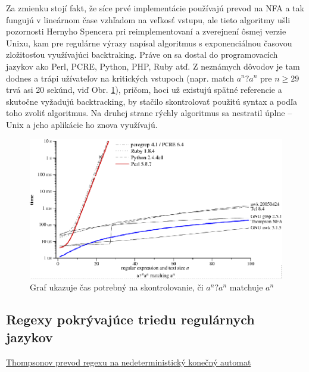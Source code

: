 Za zmienku stojí fakt, že síce prvé implementácie používajú prevod na NFA a tak fungujú v lineárnom čase vzhľadom na veľkosť vstupu, ale tieto algoritmy ušli pozornosti Hernyho Spencera pri reimplementovaní a zverejnení ôsmej verzie Unixu, kam pre regulárne výrazy napísal algoritmus s exponenciálnou časovou zložitosťou využívajúci backtraking. Práve on sa dostal do programovacích jazykov ako Perl, PCRE, Python, PHP, Ruby atď. Z neznámych dôvodov je tam dodnes a trápi užívateľov na kritických vstupoch (napr. match $a^n?a^n$ pre $n \geq 29$ trvá asi 20 sekúnd, viď Obr. \ref{fig:graf}), pričom, hoci už existujú spätné referencie a skutočne vyžadujú backtracking, by stačilo skontrolovať použitú syntax a podľa toho zvoliť algoritmus. Na druhej strane rýchly algoritmus sa nestratil úplne -- Unix a jeho aplikácie ho znova využívajú.
\begin{figure}[h]
  \centering
  \includegraphics[width=1\textwidth]{obrazky/graf}
  \caption{Graf ukazuje čas potrebný na skontrolovanie, či $a^n?a^n$ matchuje $a^n$}
  \label{fig:graf}
\end{figure}

\subsection*{Regexy pokrývajúce triedu regulárnych jazykov}
\label{praxregex}

\underline{Thompsonov prevod regexu na nedeterministický konečný automat}\cite{Cox07SlowPython}

